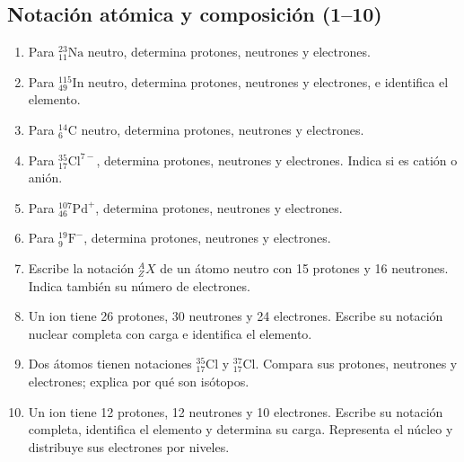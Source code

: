 \documentclass[12pt, letterpaper]{article}
\begin{document}
\subsection{Notación atómica y composición (1--10)}
\begin{enumerate}[leftmargin=*, label=\textbf{\arabic*.}]
  \item \facil{} Para $^{23}_{11}\mathrm{Na}$ neutro, determina protones, neutrones y electrones.
  \item \medio{} Para $^{115}_{49}\mathrm{In}$ neutro, determina protones, neutrones y electrones, e identifica el elemento.
  \item \medio{} Para $^{14}_{6}\mathrm{C}$ neutro, determina protones, neutrones y electrones.
  \item \medio{} Para $^{35}_{17}\mathrm{Cl}^{7-}$, determina protones, neutrones y electrones. Indica si es catión o anión.
  \item \medio{} Para $^{107}_{46}\mathrm{Pd}^{+}$, determina protones, neutrones y electrones.
  \item \facil{} Para $^{19}_{9}\mathrm{F}^{-}$, determina protones, neutrones y electrones.
  \item \medio{} Escribe la notación $^{A}_{Z}X$ de un átomo neutro con 15 protones y 16 neutrones. Indica también su número de electrones.
  \item \dificil{} Un ion tiene 26 protones, 30 neutrones y 24 electrones. Escribe su notación nuclear completa con carga e identifica el elemento.
  \item \dificil{} Dos átomos tienen notaciones $^{35}_{17}\mathrm{Cl}$ y $^{37}_{17}\mathrm{Cl}$. Compara sus protones, neutrones y electrones; explica por qué son isótopos.
  \item \dificil{} Un ion tiene 12 protones, 12 neutrones y 10 electrones. Escribe su notación completa, identifica el elemento y determina su carga. Representa el núcleo y distribuye sus electrones por niveles.
\end{enumerate}
\end{document}
